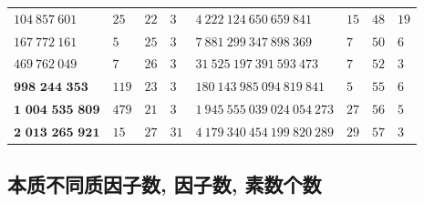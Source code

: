 \begin{tabular}{llll|llll}
    \(104~857~601\)            & \(25\)  & \(22\) & \(3\)  & \(4~222~124~650~659~841\)     & \(15\) & \(48\) & \(19\) \\
    \(167~772~161\)            & \(5\)   & \(25\) & \(3\)  & \(7~881~299~347~898~369\)     & \(7\)  & \(50\) & \(6\)  \\
    \(469~762~049\)            & \(7\)   & \(26\) & \(3\)  & \(31~525~197~391~593~473\)    & \(7\)  & \(52\) & \(3\)  \\
    \(\textbf{998~244~353}\)   & \(119\) & \(23\) & \(3\)  & \(180~143~985~094~819~841\)   & \(5\)  & \(55\) & \(6\)  \\
    \(\textbf{1~004~535~809}\) & \(479\) & \(21\) & \(3\)  & \(1~945~555~039~024~054~273\) & \(27\) & \(56\) & \(5\)  \\
    \(\textbf{2~013~265~921}\) & \(15\)  & \(27\) & \(31\) & \(4~179~340~454~199~820~289\) & \(29\) & \(57\) & \(3\)  \\
    \hline
\end{tabular}

\subsection{本质不同质因子数, 因子数, 素数个数}

